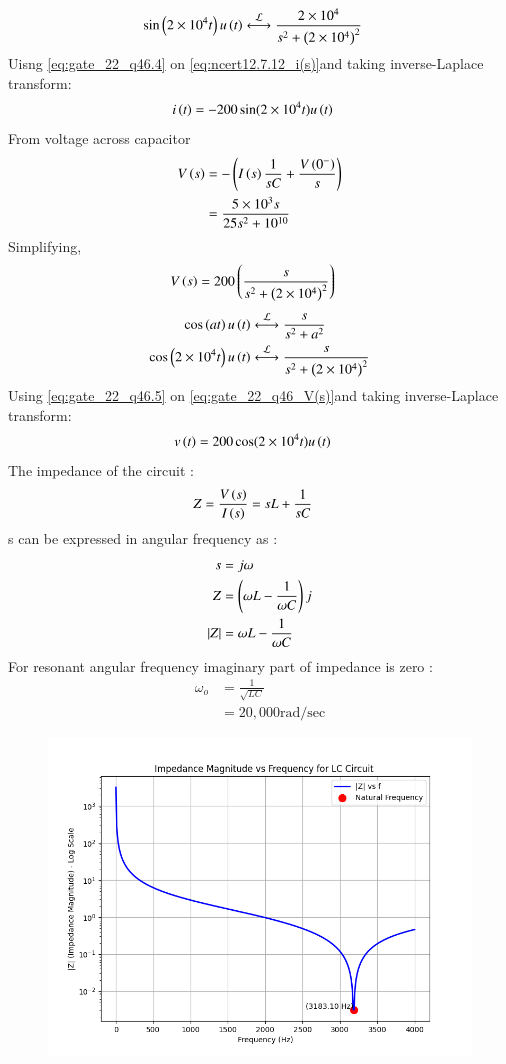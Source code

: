 \documentclass[journal,12pt,twocolumn]{IEEEtran}
\theoremstyle{remark}
\begin{document}
\begin{enumerate}[label=\textbf{(\alph*)}]
\begin{align}
    \sin\brak{2\times10^4 t}u\brak{t} &\system{L} \frac{2\times10^4}{s^2+\brak{2\times10^4}^2}\label{eq:gate_22_q46.4}
\end{align}
Uisng \eqref{eq:gate_22_q46.4} on \eqref{eq:ncert12.7.12_i(s)}and taking inverse-Laplace transform:
\begin{align}
    i\left(t\right) &= -200\sin(2\times10^4t)u\left(t\right) 
\end{align}
From  voltage across capacitor
\begin{align}
    V\left(s\right) &= -\left(I\left(s\right)\frac{1}{sC} + \frac{V\left(0^-\right)}{s}\right)\\
                &= \frac{5\times10^{3}s}{25s^2+10^{10}}\label{eq:gate_22_q46_V(s)}
\end{align}
Simplifying,
\begin{align}
    V\left(s\right) &= 200 \left(\frac{s}{s^2+\left(2\times10^4\right)^2}\right)
\end{align}
\begin{align}
    \cos\brak{at}u\brak{t} &\system{L} \frac{s}{s^2+a^2} \label{eq:gate_22_cost_result}\\
    \cos\brak{2\times10^4t}u\brak{t} &\system{L} \frac{s}{s^2+\brak{2\times10^4}^2}\label{eq:gate_22_q46.5}
\end{align}
Using \eqref{eq:gate_22_q46.5} on \eqref{eq:gate_22_q46_V(s)}and taking inverse-Laplace transform:
\begin{align}
    v\left(t\right) &=200\cos(2\times10^4t)u\left(t\right)
\end{align}
The impedance of the circuit :
\begin{align}
    Z &=\frac{V\left(s\right)}{I\left(s\right)}= sL + \frac{1}{sC}
\end{align}
s can be expressed in angular frequency as :
\begin{align}
    s &= j\omega\\
    Z &= \left(\omega L - \frac{1}{\omega C}\right)j\\
    \left\vert Z\right\vert &= \omega L - \frac{1}{\omega C}
\end{align}
For resonant angular frequency imaginary part of impedance is zero :
\begin{align}
     \omega_{o}&=\frac{1}{\sqrt{LC}}\\
          &=20,000 \text{rad/sec}
\end{align}
\begin{figure}[H]
    \includegraphics[width=0.8\columnwidth]{figs/impedance_plot.png}

\end{figure}
\end{enumerate}
\end{document}
